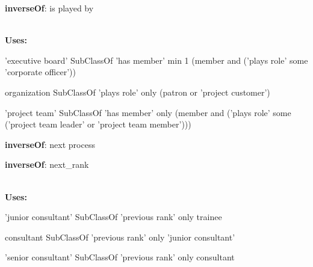 \documentclass[a4paper, DIV=13, BCOR=0cm]{scrbook}
\begin{document}
\begin{mdframed}[style=onto, frametitle={plays role}]
	{%
		\begin{compactitem}
			\item \textbf{inverseOf}: is played by
		\end{compactitem}
		\hrulefill\\
		\textbf{Uses:}
		\begin{compactitem}
			\item 'executive board' SubClassOf 'has member' min 1 (member and ('plays role' some 'corporate officer'))
			\item organization SubClassOf 'plays role' only 
			(patron or 'project customer')
			\item 'project team' SubClassOf 'has member' only 
			(member and ('plays role' some 
			('project team leader' or 'project team member')))
		\end{compactitem}
	} %
\end{mdframed}

\begin{mdframed}[style=onto, frametitle={previous process}]
	{%
		\begin{compactitem}
			\item \textbf{inverseOf}: next process
		\end{compactitem}
	} %
\end{mdframed}

\begin{mdframed}[style=onto, frametitle={previous rank}]
	{%
		\begin{compactitem}
			\item \textbf{inverseOf}: next\_rank
		\end{compactitem}
		\hrulefill\\
		\textbf{Uses:}
		\begin{compactitem}
			\item 'junior consultant' SubClassOf 'previous rank' only trainee
			\item consultant SubClassOf 'previous rank' only 'junior consultant'
			\item 'senior consultant' SubClassOf 'previous rank' only consultant
		\end{compactitem}
	} %
\end{mdframed}
\end{document}
